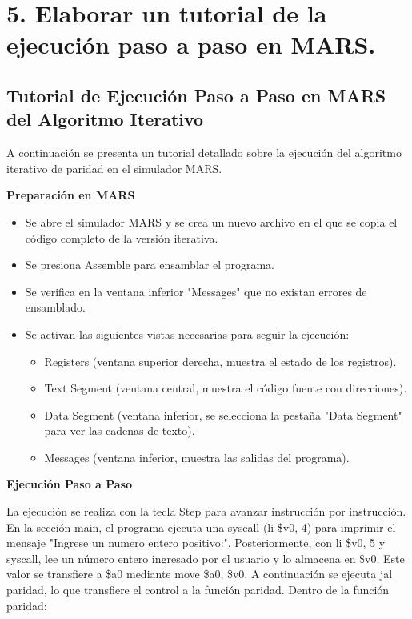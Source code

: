 \documentclass[12pt, letterpaper]{article}
\begin{document}
\newpage
\section*{5. Elaborar un tutorial de la ejecución paso a paso en MARS.}

\subsection*{Tutorial de Ejecución Paso a Paso en MARS del Algoritmo Iterativo}

A continuación se presenta un tutorial detallado sobre la ejecución del algoritmo iterativo de paridad en el simulador MARS.

\textbf{Preparación en MARS}
\begin{itemize}
    \item Se abre el simulador MARS y se crea un nuevo archivo en el que se copia el código completo de la versión iterativa.
    \item Se presiona Assemble para ensamblar el programa.
    \item Se verifica en la ventana inferior "Messages" que no existan errores de ensamblado.
    \item Se activan las siguientes vistas necesarias para seguir la ejecución:
    \begin{itemize}
        \item Registers (ventana superior derecha, muestra el estado de los registros).
        \item Text Segment (ventana central, muestra el código fuente con direcciones).
        \item Data Segment (ventana inferior, se selecciona la pestaña "Data Segment" para ver las cadenas de texto).
        \item Messages (ventana inferior, muestra las salidas del programa).
    \end{itemize}
\end{itemize}    

\textbf{Ejecución Paso a Paso}

La ejecución se realiza con la tecla Step para avanzar instrucción por instrucción. En la sección main, el programa ejecuta una syscall (li \$v0, 4) para imprimir el mensaje "Ingrese un numero entero positivo:". Posteriormente, con li \$v0, 5 y syscall, lee un número entero ingresado por el usuario y lo almacena en \$v0. Este valor se transfiere a \$a0 mediante move \$a0, \$v0. A continuación se ejecuta jal paridad, lo que transfiere el control a la función paridad. Dentro de la función paridad:
\end{document}
